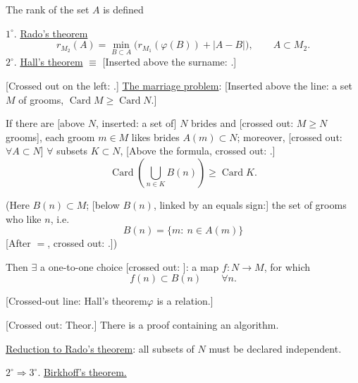 The rank of the set $A$ is defined

$1^{\circ}$. \underline{Rado's theorem}
\begin{equation*}
r_{M_2}(A)=\min_{B\subset A}
\bigl(r_{M_1}(\varphi(B))+|A-B|\bigr),\qquad A\subset M_2.
\end{equation*}
$2^{\circ}$. \underline{Hall's theorem} $\equiv$
[Inserted above the surname:
.]

[Crossed out on the left:
.]
\underline{The marriage problem}:
[Inserted above the line: a set $M$ of grooms,
$\operatorname{Card}M\geq\operatorname{Card}N$.]

If there are [above $N$, inserted: a set of] $N$ brides and
[crossed out: $M\geq N$ grooms], each groom $m\in M$
likes brides $A(m)\subset N$; moreover,
[crossed out: $\forall A\subset N$] $\forall$ subsets
$K\subset N$,
[Above the formula, crossed out:
.]
\begin{equation*}
\operatorname{Card}\left(\bigcup_{n\in K}B(n)\right)
\geq \operatorname{Card}K.
\end{equation*}

(Here $B(n)\subset M$;
[below $B(n)$, linked by an equals sign:]
the set of grooms who like $n$, i.e.
\begin{equation*}
B(n)=
\{m:\ n\in A(m)\}
\end{equation*}
[After $=$, crossed out:
.])

Then $\exists$ a one-to-one choice
[crossed out: ]:
a map $f:N\longrightarrow M$, for which
\begin{equation*}
f(n)\subset B(n)\qquad \forall n.
\end{equation*}

[Crossed-out line: Hall's theorem\quad $\varphi$ is a relation.]

[Crossed out: Theor.]
There is a proof containing an algorithm.

\underline{Reduction to Rado's theorem}: all subsets of $N$ must be declared independent.

$2^{\circ}\Rightarrow 3^{\circ}$. \underline{Birkhoff's theorem.}

